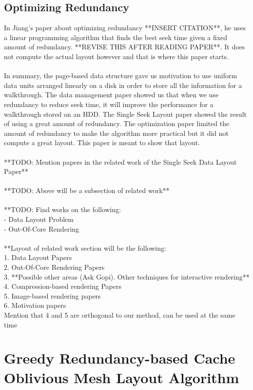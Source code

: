 \documentclass[11pt,psfig]{article}
\begin{document}
\subsection*{Optimizing Redundancy}
In Jiang's paper about optimizing redundancy **INSERT CITATION**, he uses a linear programming algorithm that finds the best seek time given a fixed amount of redundancy. **REVISE THIS AFTER READING PAPER**. It does not compute the actual layout however and that is where this paper starts. \\
\\
In summary, the page-based data structure gave us motivation to use uniform data units arranged linearly on a disk in order to store all the information for a walkthrough. The data management paper showed us that when we use redundancy to reduce seek time, it will improve the performance for a walkthrough stored on an HDD. The Single Seek Layout paper showed the result of using a great amount of redundancy. The optimization paper limited the amount of redundancy to make the algorithm more practical but it did not compute a great layout. This paper is meant to show that layout. \\
\\
**TODO: Mention papers in the related work of the Single Seek Data Layout Paper**\\
\\
**TODO: Above will be a subsection of related work**\\
\\
**TODO: Find works on the following:\\
- Data Layout Problem\\
- Out-Of-Core Rendering\\
\\
**Layout of related work section will be the following:\\
1. Data Layout Papers\\
2. Out-Of-Core Rendering Papers\\
3. **Possible other areas (Ask Gopi). Other techniques for interactive rendering**\\
4. Compression-based rendering Papers\\
5. Image-based rendering papers\\
6. Motivation papers\\
Mention that 4 and 5 are orthogonal to our method, can be used at the same time\\

\section*{Greedy Redundancy-based Cache Oblivious Mesh Layout Algorithm}
\end{document}
